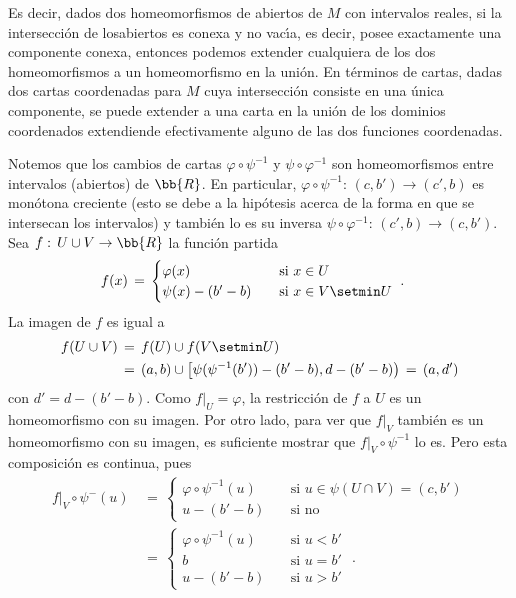 Es decir, dados dos homeomorfismos de abiertos de $M$ con intervalos reales,
si la intersecci\'{o}n de losabiertos es conexa y no vac\'{\i}a,
es decir, posee exactamente una componente conexa, entonces podemos extender
cualquiera de los dos homeomorfismos a un homeomorfismo en la uni\'{o}n.
En t\'{e}rminos de cartas, dadas dos cartas coordenadas para $M$ cuya
intersecci\'{o}n consiste en una \'{u}nica componente, se puede extender a
una carta en la uni\'{o}n de los dominios coordenados extendiende
efectivamente alguno de las dos funciones coordenadas.

Notemos que los cambios de cartas $\varphi\circ\psi^{-1}$ y
$\psi\circ\varphi^{-1}$ son homeomorfismos entre intervalos (abiertos)
de $\bb{R}$. En particular, $\varphi\circ\psi^{-1}:\,(c,b')\rightarrow (c',b)$
es mon\'{o}tona creciente (esto se debe a la hip\'{o}tesis acerca de la
forma en que se intersecan los intervalos) y tambi\'{e}n lo es su inversa
$\psi\circ\varphi^{-1}:\,(c',b)\rightarrow (c,b')$. Sea
$f:\,U\cup V\rightarrow\bb{R}$ la funci\'{o}n partida
\begin{align*}
	f(x) & \,=\,
		\begin{cases}
			\varphi(x) & \quad\text{si }x\in U \\
			\psi(x) - (b'-b) & \quad\text{si }x\in V\setmin U
		\end{cases}
	\text{ .}
\end{align*}
%
La imagen de $f$ es igual a
\begin{align*}
	f(U\cup V) & \,=\,f(U)\cup f(V\setmin U) \\
	& \,=\,(a,b)\cup \left[\psi(\psi^{-1}(b'))-(b'-b),d-(b'-b)\right)
		\,=\,(a,d')
\end{align*}
%
con $d'=d-(b'-b)$. Como $f|_{U}=\varphi$, la restricci\'{o}n de $f$ a $U$
es un homeomorfismo con su imagen.
Por otro lado, para ver que $f|_{V}$ tambi\'{e}n es un homeomorfismo
con su imagen, es suficiente mostrar que $f|_{V}\circ\psi^{-1}$ lo es.
Pero esta composici\'{o}n es continua, pues
\begin{align*}
	f|_{V}\circ\psi^{-}(u) & \,=\,
		\begin{cases}
			\varphi\circ\psi^{-1}(u) & \quad\text{si }
				u\in\psi(U\cap V)=(c,b') \\
			u-(b'-b) & \quad\text{si no}
		\end{cases} \\
	& \,=\,
		\begin{cases}
			\varphi\circ\psi^{-1}(u) & \quad\text{si } u<b' \\
			b & \quad\text{si } u=b' \\
			u-(b'-b) & \quad\text{si } u>b'
		\end{cases}
	\text{ .}
\end{align*}
